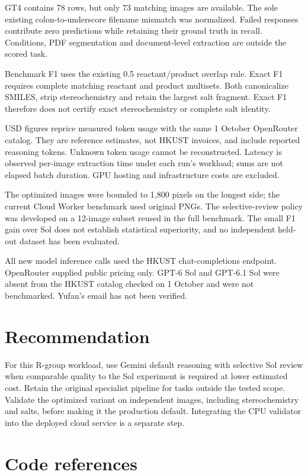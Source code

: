 \documentclass[11pt,a4paper]{article}
\begin{document}
GT4 contains 78 rows, but only 73 matching images are available. The sole existing colon-to-underscore filename mismatch was normalized. Failed responses contribute zero predictions while retaining their ground truth in recall. Conditions, PDF segmentation and document-level extraction are outside the scored task.

Benchmark F1 uses the existing 0.5 reactant/\allowbreak{}product overlap rule. Exact F1 requires complete matching reactant and product multisets. Both canonicalize SMILES, strip stereochemistry and retain the largest salt fragment. Exact F1 therefore does not certify exact stereochemistry or complete salt identity.

USD figures reprice measured token usage with the same 1 October OpenRouter catalog. They are reference estimates, not HKUST invoices, and include reported reasoning tokens. Unknown token usage cannot be reconstructed. Latency is observed per-image extraction time under each run's workload; sums are not elapsed batch duration. GPU hosting and infrastructure costs are excluded.

The optimized images were bounded to 1,800 pixels on the longest side; the current Cloud Worker benchmark used original PNGs. The selective-review policy was developed on a 12-image subset reused in the full benchmark. The small F1 gain over Sol does not establish statistical superiority, and no independent held-out dataset has been evaluated.

All new model inference calls used the HKUST chat-completions endpoint. OpenRouter supplied public pricing only. GPT-6 Sol and GPT-6.1 Sol were absent from the HKUST catalog checked on 1 October and were not benchmarked. Yufan's email has not been verified.

\section{Recommendation}

For this R-group workload, use Gemini default reasoning with selective Sol review when comparable quality to the Sol experiment is required at lower estimated cost. Retain the original specialist pipeline for tasks outside the tested scope. Validate the optimized variant on independent images, including stereochemistry and salts, before making it the production default. Integrating the CPU validator into the deployed cloud service is a separate step.

\section{Code references}
\end{document}
